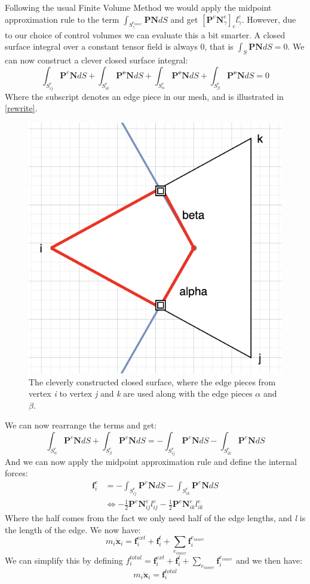 Following the usual Finite Volume Method we would apply the midpoint approximation rule to the term $\int_{S^{e_{inner}}_\gamma}\mathbf{P}\mathbf{N}dS$ and get $\left[\mathbf{P}^e\mathbf{N}^e_\gamma\right]_c l^e_\gamma$. However, due to our choice of control volumes we can evaluate this a bit smarter. A closed surface integral over a constant tensor field is always 0, that is $\int_S \mathbf{P}\mathbf{N}dS = 0$. We can now construct a clever closed surface integral:
\begin{equation*}
	\int_{S^e_{ij}}\mathbf{P}^e\mathbf{N}dS + \int_{S^e_{ik}} \mathbf{P^e}\mathbf{N}dS + \int_{S^e_{\alpha}} \mathbf{P^e}\mathbf{N}dS + \int_{S^e_{\beta}} \mathbf{P^e}\mathbf{N}dS = 0
\end{equation*}
Where the subscript denotes an edge piece in our mesh, and is illustrated in \autoref{rewrite}.
\begin{figure}
	\centering
	\includegraphics[width=0.4\linewidth]{Materials/rewrite}
	\caption{The cleverly constructed closed surface, where the edge pieces from vertex \textit{i} to vertex \textit{j} and \textit{k} are used along with the edge pieces $\alpha$ and $\beta$.}
	\label{rewrite}
\end{figure}
We can now rearrange the terms and get:
\begin{equation*}
	\int_{S^e_{\alpha}} \mathbf{P}^e\mathbf{N}dS + \int_{S^e_{\beta}} \mathbf{P}^e\mathbf{N}dS = -\int_{S^e_{ij}}\mathbf{P}^e\mathbf{N}dS - \int_{S^e_{ik}} \mathbf{P}^e\mathbf{N}dS
\end{equation*}
And we can now apply the midpoint approximation rule and define the internal forces:
\begin{align*}
	\mathbf{f}^e_i &=  -\int_{S^e_{ij}}\mathbf{P}^e\mathbf{N}dS - \int_{S^e_{ik}} \mathbf{P}^e\mathbf{N}dS\\
	&\iff -\frac{1}{2}\mathbf{P}^e\mathbf{N}^e_{ij}l^e_{ij} - \frac{1}{2}\mathbf{P}^e\mathbf{N}^e_{ik}l^e_{ik}
\end{align*}
Where the half comes from the fact we only need half of the edge lengths, and \textit{l} is the length of the edge. We now have:
\begin{equation*}
	m_i\ddot{\mathbf{x}}_i = \mathbf{f}^{ext}_i + \mathbf{f}^t_i + \sum_{e_{inner}} \mathbf{f}^{e_{inner}}_i
\end{equation*}
We can simplify this by defining $f^{total}_i =  \mathbf{f}^{ext}_i + \mathbf{f}^t_i + \sum_{e_{inner}} \mathbf{f}^{e_{inner}}_i$ and we then have:
\begin{equation*}
	m_i\ddot{\mathbf{x}}_i = \mathbf{f}^{total}_i
\end{equation*}

